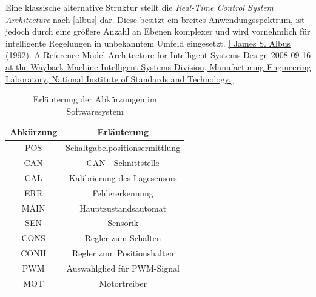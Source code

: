 Eine klassische alternative Struktur stellt die \textit{Real-Time Control System Architecture} nach \autoref{albus} dar. Diese besitzt ein breites Anwendungsspektrum, ist jedoch durch eine größere Anzahl an Ebenen komplexer und wird vornehmlich für intelligente Regelungen in unbekanntem Umfeld eingesetzt. \autoref{ James S. Albus (1992). A Reference Model Architecture for Intelligent Systems Design 2008-09-16 at the Wayback Machine Intelligent Systems Division, Manufacturing Engineering Laboratory, National Institute of Standards and Technology.}
\begin{table}%
\centering
\begin{tabular}{c c}
\hline
Abkürzung & Erläuterung \\
\hline
POS & Schaltgabelpositionsermittlung\\
CAN & CAN - Schnittstelle\\
CAL & Kalibrierung des Lagesensors\\
ERR & Fehlererkennung\\
MAIN & Hauptzustandsautomat\\
SEN & Sensorik\\
CONS & Regler zum Schalten\\
CONH & Regler zum Positionshalten\\
PWM & Auswahlglied für PWM-Signal\\
MOT & Motortreiber \\

\end{tabular}
\caption{Erläuterung der Abkürzungen im Softwaresystem}
\label{tab_kurz}
\end{table} 

